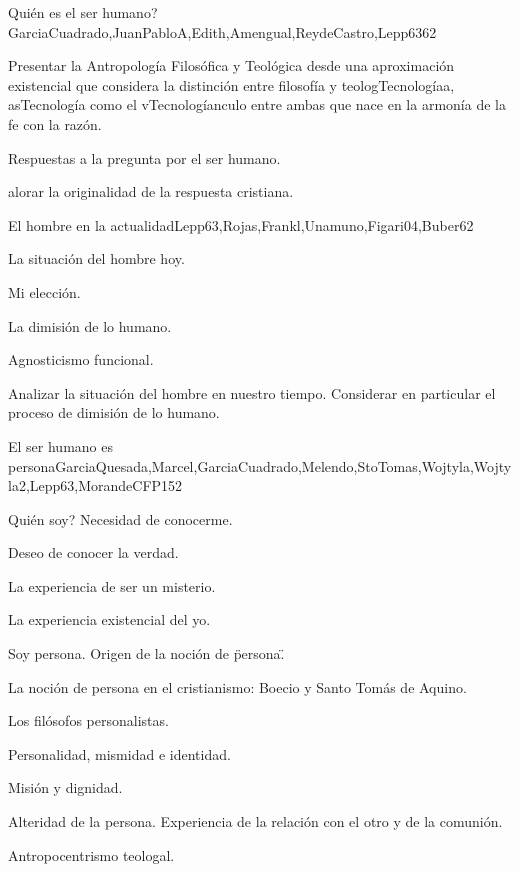 \begin{syllabus}
\begin{unit}{Quién es el ser humano?}{GarciaCuadrado,JuanPabloA,Edith,Amengual,ReydeCastro,Lepp63}{6}{2}
\begin{unitgoals}
	\item Presentar la Antropología Filosófica y Teológica desde una aproximación existencial que considera la distinción entre filosofía y teologTecnologíaa, asTecnología como el vTecnologíanculo entre ambas que nace en la armonía de la fe con la razón.
	\item Respuestas a la pregunta por el ser humano.
	\item alorar la originalidad de la respuesta cristiana.
\end{unitgoals}
\end{unit}

\begin{unit}{El hombre en la actualidad}{Lepp63,Rojas,Frankl,Unamuno,Figari04,Buber}{6}{2}
\begin{topics}
 		\item La situación del hombre hoy.
 		\item Mi elección.
 		\item La dimisión de lo humano.
 		\item Agnosticismo funcional.
\end{topics}

\begin{unitgoals}
	\item Analizar la situación del hombre en nuestro tiempo. Considerar en particular el proceso de dimisión de lo humano. 
\end{unitgoals}
\end{unit}

\begin{unit}{El ser humano es persona}{GarciaQuesada,Marcel,GarciaCuadrado,Melendo,StoTomas,Wojtyla,Wojtyla2,Lepp63,MorandeCFP}{15}{2}
\begin{topics}
 		\item Quién soy? Necesidad de conocerme.
 		\item Deseo de conocer la verdad.
 		\item La experiencia de ser un misterio.
 		\item La experiencia existencial del yo.
 		\item Soy persona. Origen de la noción de \"persona\".
 		\item La noción de persona en el cristianismo: Boecio y Santo Tomás de Aquino.
 		\item Los filósofos personalistas.
 		\item Personalidad, mismidad e identidad.
 		\item Misión y dignidad.
 		\item Alteridad de la persona. Experiencia de la relación con el otro y de la comunión.
 		\item Antropocentrismo teologal.
\end{topics}


\end{unit}
\end{syllabus}
